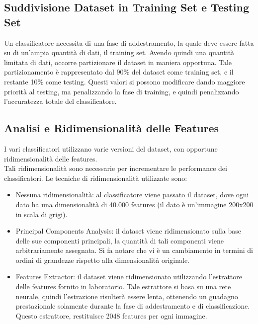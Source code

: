 \documentclass[12pt]{IEEEtran}
\begin{document}
\subsection{Suddivisione Dataset in Training Set e Testing Set}
Un classificatore necessita di una fase di addestramento, la quale deve essere fatta su di un'ampia quantità di dati, il training set. Avendo quindi una quantità limitata di dati, occorre partizionare il dataset in maniera opportuna. Tale partizionamento è rappresentato dal 90\% del dataset come training set, e il restante 10\% come testing. Questi valori si possono modificare dando maggiore priorità al testing, ma penalizzando la fase di training, e quindi penalizzando l'accuratezza totale del classificatore. 
\subsection{Analisi e Ridimensionalità delle Features}
I vari classificatori utilizzano varie versioni del dataset, con opportune ridimensionalità delle features. \\
Tali ridimensionalità sono necessarie per incrementare le performance dei classificatori. 
Le tecniche di ridimensionalità utilizzate sono: 
\begin{itemize}
    \item Nessuna ridimensionalità: al classificatore viene passato il dataset, dove ogni dato ha una dimensionalità di 40.000 features (il dato è un'immagine 200x200 in scala di grigi).
    \item Principal Components Analysis: il dataset viene ridimensionato sulla base delle sue componenti principali, la quantità di tali componenti viene arbitrariamente assegnata. Si fa notare che vi è un cambiamento in termini di ordini di grandezze rispetto alla dimensionalità originale. 
    \item Features Extractor: il dataset viene ridimensionato utilizzando l'estrattore delle features fornito in laboratorio. Tale estrattore si basa su una rete neurale, quindi l'estrazione risulterà essere lenta, ottenendo un guadagno prestazionale solamente durante la fase di addestramento e di classificazione. Questo estrattore, restituisce 2048 features per ogni immagine. \\
\end{itemize}
\end{document}
